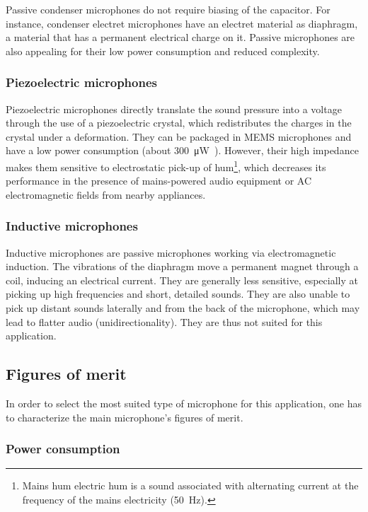 \documentclass{EPL-master-thesis-covers-EN}
\begin{document}
Passive condenser microphones do not require biasing of the capacitor. For instance, condenser electret microphones have an electret material as diaphragm, a material that has a permanent electrical charge on it. Passive microphones are also appealing for their low power consumption and reduced complexity.
 
\subsubsection*{Piezoelectric microphones}

Piezoelectric microphones directly translate the sound pressure into a voltage through the use of a piezoelectric crystal, which redistributes the charges in the crystal under a deformation. They can be packaged in MEMS microphones and have a low power consumption (about \SI{300}{\micro W}~\cite{PMM-3738-VM1000-R}). However, their high impedance makes them sensitive to electrostatic pick-up of hum\footnote{Mains hum electric hum is a sound associated with alternating current at the frequency of the mains electricity (\SI{50}{Hz}).}, which decreases its performance in the presence of mains-powered audio equipment or AC electromagnetic fields from nearby appliances.

\subsubsection*{Inductive microphones}

Inductive microphones are passive microphones working via electromagnetic induction. The vibrations of the diaphragm move a permanent magnet through a coil, inducing an electrical current. They are generally less sensitive, especially at picking up high frequencies and short, detailed sounds. They are also unable to pick up distant sounds laterally and from the back of the microphone, which may lead to flatter audio (unidirectionality). They are thus not suited for this application.


\subsection*{Figures of merit}

In order to select the most suited type of microphone for this application, one has to characterize the main microphone's figures of merit.

\subsubsection*{Power consumption}
\end{document}
